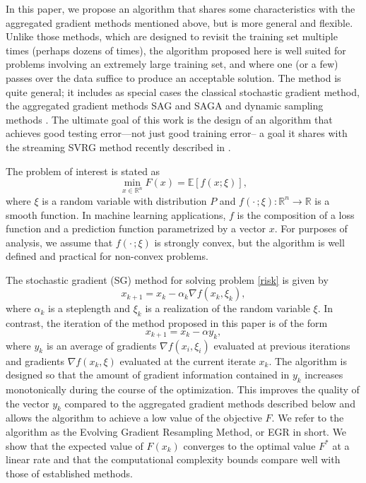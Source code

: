 \documentclass[11pt]{article}
\begin{document}
In this paper, we propose an algorithm that shares some characteristics with the aggregated gradient methods mentioned above, but is more general and flexible. Unlike those methods, which are designed to revisit the training set multiple times (perhaps dozens of times), the algorithm proposed here is well suited for problems involving an extremely large training set, and where one (or a few) passes over the data suffice to produce an acceptable solution. The method is quite general; it includes as special cases  the classical stochastic gradient method, the aggregated gradient methods SAG and SAGA  \cite{NIPS2014_5258,mairal2015incremental} and  dynamic sampling methods \cite{dss,FS2011,2014pasglyetal}. The ultimate goal of this work is the design of an algorithm that achieves good testing error---not just good training error-- a goal it shares with the streaming SVRG method recently described in \cite{frostig2014competing}.


The problem of interest is stated as
\begin{equation}  \label{risk}
	\min_{x \in \mathbb{R}^n} F(x) = \mathbb{E}[ f(x;\xi)] ,
\end{equation}
where $\xi$ is a random variable with distribution $P$ and $f(\cdot\,; \xi): \mathbb{R}^n \rightarrow \mathbb{R}$  is a smooth function. In machine learning applications, $f$ is the composition of a  loss function and a prediction function parametrized by a vector $x$. 
For purposes of analysis, we assume that $f(\cdot\,; \xi)$ is strongly convex, but the algorithm is well defined and practical for non-convex problems. 

The stochastic gradient (SG) method for solving problem \eqref{risk} is given by 
\begin{equation}   \label{sgdm}
 x_{k+1} = x_k- \alpha_k  \nabla f(x_k, \xi_k), 
 \end{equation}
where $\alpha_k$ is a steplength and $\xi_k$ is a realization of the random variable $\xi$. In contrast, the iteration of the method proposed in this paper is of the form
\begin{equation}   \label{iteration}
   	 x_{k+1} = x_k  - \alpha  y_k ,
\end{equation}
where $y_k$ is an average of gradients $\nabla f(x_i, \xi_i)$ evaluated at previous iterations and  gradients $\nabla f(x_k, \xi)$ evaluated at the current iterate $x_k$.  The algorithm is designed so that  the amount of gradient information contained in $y_k$ increases monotonically during the course of the optimization.  This improves the quality of the vector $y_k$ compared to the aggregated gradient methods described below and allows the algorithm to achieve a low  value of the objective $F$. We refer to the algorithm as the Evolving Gradient Resampling Method, or EGR in short. We show that the expected value of $F(x_k)$ converges to the optimal value  $F^\ast$ at a linear rate and that the computational complexity bounds compare well with those of established methods.  
\end{document}
